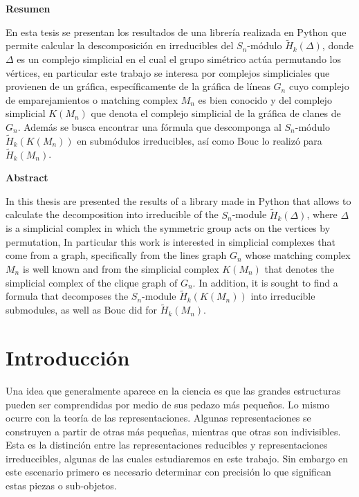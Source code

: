 \documentclass[12pt]{book}
\theoremstyle{definition}
\newcounter{in}
\begin{document}
\thispagestyle{empty}

\tableofcontents

\newpage

\begin{flushleft}
  {\bfseries\Large Resumen}
\end{flushleft}

En esta tesis se presentan los resultados de una librería realizada en
Python que permite calcular la descomposición en irreducibles del
$S_n$-módulo $\widetilde H_{k}(\Delta)$, donde $\Delta$ es un complejo
simplicial en el cual el grupo simétrico actúa permutando los
vértices, en particular este trabajo se interesa por complejos
simpliciales que provienen de un gráfica, específicamente de la
gráfica de líneas $G_n$ cuyo complejo de emparejamientos o matching
complex $M_n$ es bien conocido y del complejo simplicial $K(M_n)$ que
denota el complejo simplicial de la gráfica de clanes de $G_n$. Además
se busca encontrar una fórmula que descomponga al $S_n$-módulo
$\widetilde H_{k}(K(M_n))$ en submódulos irreducibles, así como Bouc
\cite{MR756517} lo realizó para $\widetilde H_{k}(M_n)$.

\vspace{2cm}

\begin{flushleft}
  {\bfseries\Large Abstract}
\end{flushleft}

In this thesis are presented the results of a library made in Python
that allows to calculate the decomposition into irreducible of the
$S_n$-module $\widetilde H_{k}(\Delta)$, where $\Delta$ is a
simplicial complex in which the symmetric group acts on the vertices
by permutation, In particular this work is interested in simplicial
complexes that come from a graph, specifically from the lines graph
$G_n$ whose matching complex $M_n$ is well known and from the
simplicial complex $K(M_n)$ that denotes the simplicial complex of the
clique graph of $G_n$. In addition, it is sought to find a formula
that decomposes the $S_n$-module $\widetilde H_{k}(K(M_n))$ into
irreducible submodules, as well as Bouc \cite{MR756517} did for
$\widetilde H_{k}(M_n)$.

 \newpage \thispagestyle{empty}
 
 \chapter*{Introducción}

 Una idea que generalmente aparece en la ciencia es que las grandes
 estructuras pueden ser comprendidas por medio de sus pedazo más
 pequeños. Lo mismo ocurre con la teoría de las
 representaciones. Algunas representaciones se construyen a partir de
 otras más pequeñas, mientras que otras son indivisibles. Esta es la
 distinción entre las representaciones reducibles y representaciones
 irreduccibles, algunas de las cuales estudiaremos en este
 trabajo. Sin embargo en este escenario primero es necesario
 determinar con precisión lo que significan estas piezas o
 sub-objetos.
\end{document}
